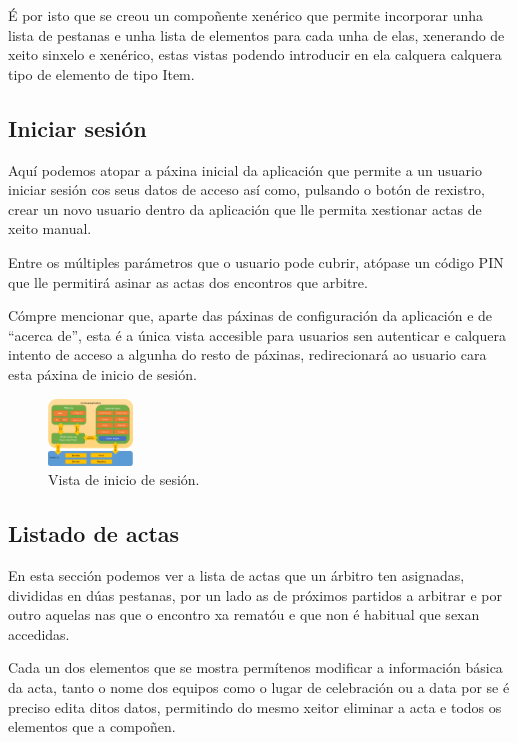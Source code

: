       É por isto que se creou un compoñente xenérico que permite incorporar 
unha lista de pestanas e unha lista de elementos para cada unha de elas, 
xenerando de xeito sinxelo e xenérico, estas vistas podendo introducir en ela 
calquera calquera tipo de elemento de tipo Item.

    \subsection{Iniciar sesión}
    Aquí podemos atopar a páxina inicial da aplicación que permite a un 
usuario iniciar sesión cos seus datos de acceso así como, pulsando o botón de 
rexistro, crear un novo usuario dentro da aplicación que lle permita xestionar
actas de xeito manual.

    Entre os múltiples parámetros que o usuario pode cubrir, atópase un código 
PIN que lle permitirá asinar as actas dos encontros que arbitre.

    Cómpre mencionar que, aparte das páxinas de configuración da aplicación e 
de ``acerca de'', esta é a única vista accesible para usuarios sen autenticar e 
calquera intento de acceso a algunha do resto de páxinas, redirecionará ao 
usuario cara esta páxina de inicio de sesión.

      \begin{figure}[h!]
        \begin{center}
        \includegraphics[width=0.2\textwidth]{./img/cordova_arquitectura.png}
        \caption{Vista de inicio de sesión.}
        \end{center}
      \end{figure}

    \subsection{Listado de actas}
    En esta sección podemos ver a lista de actas que un árbitro ten 
asignadas, divididas en dúas pestanas, por un lado as de próximos partidos a 
arbitrar e por outro aquelas nas que o encontro xa rematóu e que non é habitual 
que sexan accedidas.

    Cada un dos elementos que se mostra permítenos modificar a información 
básica da acta, tanto o nome dos equipos como o lugar de celebración ou a data 
por se é preciso edita ditos datos, permitindo do mesmo xeitor eliminar a acta e 
todos os elementos que a compoñen.

